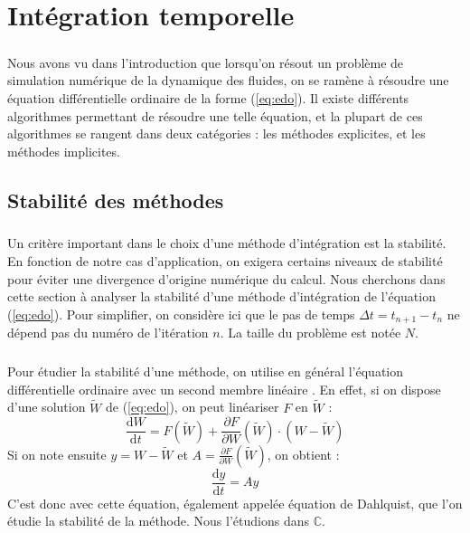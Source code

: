 \chapter{Intégration temporelle}

\paragraph{}
Nous avons vu dans l'introduction que lorsqu'on résout un problème de simulation numérique de la dynamique des fluides, on se ramène à résoudre une équation différentielle ordinaire de la forme (\ref{eq:edo}).
Il existe différents algorithmes permettant de résoudre une telle équation, et la plupart de ces algorithmes se rangent dans deux catégories : les méthodes explicites, et les méthodes implicites.

\section{Stabilité des méthodes}

  \paragraph{}
  Un critère important dans le choix d'une méthode d'intégration est la stabilité.
  En fonction de notre cas d'application, on exigera certains niveaux de stabilité pour éviter une divergence d'origine numérique du calcul.
  Nous cherchons dans cette section à analyser la stabilité d'une méthode d'intégration de l'équation (\ref{eq:edo}).
  Pour simplifier, on considère ici que le pas de temps $\Delta t = t_{n+1} - t_n$ ne dépend pas du numéro de l'itération $n$.
  La taille du problème est notée $N$.

  \paragraph{}
  Pour étudier la stabilité d'une méthode, on utilise en général l'équation différentielle ordinaire avec un second membre linéaire \cite{HairerWanner1996}.
  En effet, si on dispose d'une solution $\tilde{W}$ de (\ref{eq:edo}), on peut linéariser $F$ en $\tilde{W}$ :
  $$\frac{\mathrm{d}W}{\mathrm{d}t} = F\left(\tilde{W}\right) + \frac{\partial F}{\partial W}\left(\tilde{W}\right)\cdot\left(W - \tilde{W}\right)$$
  Si on note ensuite $y = W - \tilde{W}$ et $A = \frac{\partial F}{\partial W}\left(\tilde{W}\right)$, on obtient :
  \begin{equation}\label{eq:stab}
    \frac{\mathrm{d}y}{\mathrm{d}t} = Ay
  \end{equation}
  C'est donc avec cette équation, également appelée équation de Dahlquist, que l'on étudie la stabilité de la méthode.
  Nous l'étudions dans $\mathbb{C}$.

